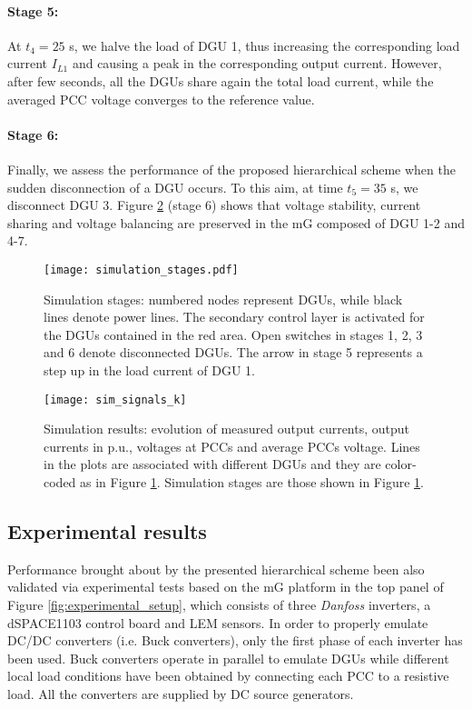 \documentclass[a4paper]{article}
\theoremstyle{plain}
\begin{document}
\paragraph{Stage 5:} At $t_4 = 25$ s, we halve the load of DGU 1,
thus increasing the corresponding load current $I_{L1}$ and causing a
peak in the corresponding output current. However, after few seconds,
all the DGUs share again the total load current, while the averaged PCC voltage converges to the reference value. 

\paragraph{Stage 6:}  Finally, we assess the performance of the proposed hierarchical scheme when the sudden disconnection of a DGU occurs. To this aim, at time $t_5 = 35$ s, we disconnect DGU 3. Figure \ref{fig:sim_complete_1} (stage 6) shows that voltage stability, current sharing and voltage balancing are preserved in the mG composed of DGU 1-2 and 4-7.


\begin{figure}
	\centering
	\texttt{[image: simulation\_stages.pdf]}
	\caption{Simulation stages: numbered nodes represent DGUs, while black lines denote power lines. The secondary control layer is activated for the DGUs contained in the red area. Open switches in stages 1, 2, 3 and 6 denote disconnected DGUs. The arrow in stage 5 represents a step up in the load current of DGU 1.}
	\label{fig:sim_stages}
\end{figure}
\begin{figure}
	\centering
	\texttt{[image: sim\_signals\_k]}
	\caption{Simulation results: evolution of measured output currents, output currents in p.u., 
		voltages at PCCs and average PCCs voltage. Lines in the
		plots are associated with different DGUs and they are color-coded as in Figure \ref{fig:sim_stages}. Simulation stages are those shown in Figure \ref{fig:sim_stages}.}
	\label{fig:sim_complete_1}
\end{figure}
\subsection{Experimental results}
\label{sec:experiments}
Performance brought about by the presented hierarchical scheme been also validated via experimental tests based on the mG platform in the top panel of Figure \ref{fig:experimental_setup}, which consists of three \textit{Danfoss} inverters, a dSPACE1103 control board and LEM sensors. In order to properly emulate DC/DC converters (i.e. Buck converters), only the first phase of each inverter has been used. Buck converters operate in parallel to emulate DGUs while different local load conditions have been obtained by connecting each PCC to a resistive load. All the converters are supplied by DC source generators.
\end{document}
